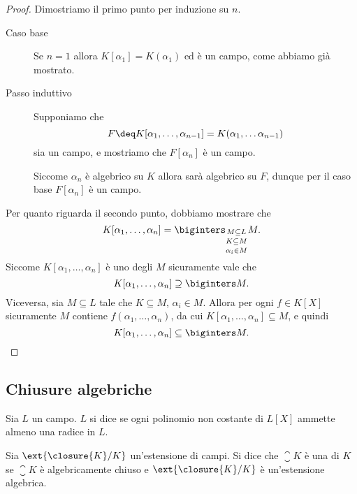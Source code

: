 \begin{proof}
    Dimostriamo il primo punto per induzione su $n$.
    \begin{description}
        \item[Caso base] Se $n = 1$ allora $K[\alpha_1] = K(\alpha_1)$ ed è un campo, come abbiamo già mostrato.
        \item[Passo induttivo] Supponiamo che \[
            F \deq K[\alpha_1, \dots, \alpha_{n-1}] = K(\alpha_1, \dots \alpha_{n-1}) 
        \] sia un campo, e mostriamo che $F[\alpha_n]$ è un campo. 

        Siccome $\alpha_n$ è algebrico su $K$ allora sarà algebrico su $F$, dunque per il caso base $F[\alpha_n]$ è un campo. 
    \end{description}

    Per quanto riguarda il secondo punto, dobbiamo mostrare che \[
        K[\alpha_1, \dots, \alpha_n] = \biginters_{\substack{M \subseteq L \\[2pt] K \subseteq M \\[2pt] \alpha_i \in M}} M.    
    \]
    Siccome $K[\alpha_1, \dots, \alpha_n]$ è uno degli $M$ sicuramente vale che \[
        K[\alpha_1, \dots, \alpha_n] \supseteq \biginters M.
    \] Viceversa, sia $M \subseteq L$ tale che $K \subseteq M$, $\alpha_i \in M$. Allora per ogni $f \in K[X]$ sicuramente $M$ contiene $f(\alpha_1, \dots, \alpha_n)$, da cui $K[\alpha_1, \dots, \alpha_n] \subseteq M$, e quindi \[
        K[\alpha_1, \dots, \alpha_n] \subseteq \biginters M.
    \]
\end{proof}

\subsection{Chiusure algebriche}

\begin{definition}
    Sia $L$ un campo. $L$ si dice  se ogni polinomio non costante di $L[X]$ ammette almeno una radice in $L$.
\end{definition}

\begin{definition}
    Sia $\ext{\closure{K} / K}$ un'estensione di campi. Si dice che $\closure{K}$ è una  di $K$ se $\closure K$ è algebricamente chiuso e $\ext{\closure{K} / K}$ è un'estensione algebrica.
\end{definition}


